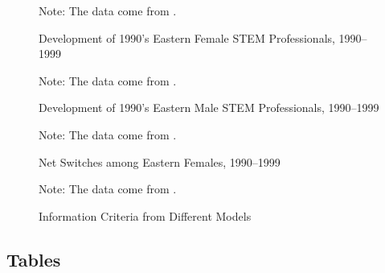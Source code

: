 \documentclass[a4paper, oneside, hyperfootnotes = false]{article}
\begin{document}
{\begin{figure}[ht]
	\centering
	\caption{Development of 1990's Eastern Female STEM Professionals, 1990--1999}
	\label{fig:survivalfemale}
	\fontsize{9pt}{11pt}\selectfont
	\def\svgwidth{\textwidth}
	
	\vspace{2mm}
	\parbox{10cm}{
	\linespread{1}\footnotesize Note: The data come from \cite{SOEP2023}.}
\end{figure}

\begin{figure}[ht]
	\centering
	\caption{Development of 1990's Eastern Male STEM Professionals, 1990--1999}
	\label{fig:survivalmale}
	\fontsize{9pt}{11pt}\selectfont
	\def\svgwidth{\textwidth}
	
	\vspace{2mm}
	\parbox{10cm}{
	\linespread{1}\footnotesize Note: The data come from \cite{SOEP2023}.}
\end{figure}

\begin{figure}[ht]
	\centering
	\caption{Net Switches among Eastern Females, 1990--1999}
	\label{fig:netswitches}
	\fontsize{9pt}{11pt}\selectfont
	\def\svgwidth{\textwidth}
	
	\vspace{2mm}
	\parbox{10cm}{
		\linespread{1}\footnotesize Note: The data come from \cite{SOEP2023}.}
\end{figure}

\begin{figure}[ht]
	\centering
	\caption{Information Criteria from Different Models}
	\label{fig:information}
	\fontsize{9pt}{11pt}\selectfont
	\def\svgwidth{\textwidth}
	
	\vspace{2mm}
	\parbox{10cm}{
		\linespread{1}\footnotesize Note: The data come from \cite{SOEP2023}.}
\end{figure}

\clearpage

{}
\subsection*{Tables}
\label{tables}

}
\end{document}
